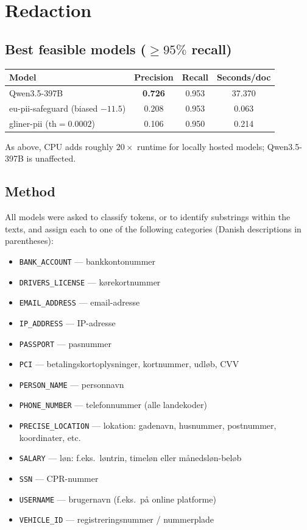 \documentclass[11pt,a4paper]{article}
\begin{document}
\section{Redaction}

\subsection{Best feasible models ($\geq 95\%$ recall)}

\begin{table}[H]
\centering
\begin{tabular}{lccc}
\toprule
\textbf{Model} & \textbf{Precision} & \textbf{Recall} & \textbf{Seconds/doc} \\
\midrule
Qwen3.5-397B                       & \textbf{0.726} & 0.953 & 37.370 \\
eu-pii-safeguard (biased $-11.5$)  & 0.208          & 0.953 & 0.063 \\
gliner-pii ($\text{th}=0.0002$)    & 0.106          & 0.950 & 0.214 \\
\bottomrule
\end{tabular}
\end{table}

As above, CPU adds roughly $20\times$ runtime for locally hosted models; Qwen3.5-397B is unaffected.

\subsection{Method}

All models were asked to classify tokens, or to identify substrings within the texts, and assign each to one of the following categories (Danish descriptions in parentheses):

\begin{itemize}[leftmargin=*, itemsep=1pt]
  \item \texttt{BANK\_ACCOUNT} --- bankkontonummer
  \item \texttt{DRIVERS\_LICENSE} --- kørekortnummer
  \item \texttt{EMAIL\_ADDRESS} --- email-adresse
  \item \texttt{IP\_ADDRESS} --- IP-adresse
  \item \texttt{PASSPORT} --- pasnummer
  \item \texttt{PCI} --- betalingskortoplysninger, kortnummer, udløb, CVV
  \item \texttt{PERSON\_NAME} --- personnavn
  \item \texttt{PHONE\_NUMBER} --- telefonnummer (alle landekoder)
  \item \texttt{PRECISE\_LOCATION} --- lokation: gadenavn, husnummer, postnummer, koordinater, etc.
  \item \texttt{SALARY} --- løn: f.eks.\ løntrin, timeløn eller månedsløn-beløb
  \item \texttt{SSN} --- CPR-nummer
  \item \texttt{USERNAME} --- brugernavn (f.eks.\ på online platforme)
  \item \texttt{VEHICLE\_ID} --- registreringsnummer / nummerplade
\end{itemize}
\end{document}
